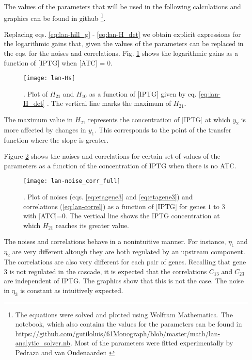 The values of the parameters that will be used in the following calculations and graphics can be found in github \footnote{The equations were solved and plotted using Wolfram Mathematica. The notebook, which also contains the values for the parameters can be found in \url{https://github.com/gutiloluis/61Monograph/blob/master/math/lan-analytic_solver.nb}. Most of the parameters were fitted experimentally by Pedraza and van Oudenaarden \cite{pedraza05}}. 

Replacing eqs. \eqref{eq:lan-hill_g} - \eqref{eq:lan-H_det} we obtain explicit expressions for the logarithmic gains that, given the values of the parameters can be replaced in the eqs. for the noises and correlations. Fig. \ref{fig:lan-Hs} shows the logarithmic gains as a function of [IPTG] when [ATC] = 0.

\begin{figure}[H]
  \centering
  \texttt{[image: lan-Hs]}
  \caption[Logarithmic gains for the genes of a cascade]{\label{fig:lan-Hs}. Plot of $H_{21}$ and $H_{10}$ as a function of [IPTG] given by eq. \eqref{eq:lan-H_det} . The vertical line marks the maximum of $H_{21}$.}
\end{figure}

The maximum value in $H_{21}$ represents the concentration of [IPTG] at which $y_2$ is more affected by changes in $y_1$. This corresponds to the point of the transfer function where the slope is greater.

Figure \ref{fig:lan-noise_corr_full} shows the noises and correlations for certain set of values of the parameters as a function of the concentration of IPTG when there is no ATC.

\begin{figure}[H]
  \centering
  \texttt{[image: lan-noise\_corr\_full]}
  \caption[Noises and correlation for the genes of a cascade]{\label{fig:lan-noise_corr_full}. Plot of noises (eqs. \eqref{eq:etagene3} and \eqref{eq:etagene3}) and correlations (\eqref{eq:lan-correl}) as a function of [IPTG] for genes $1$ to $3$ with [ATC]=0. The vertical line shows the IPTG concentration at which $H_{21}$ reaches its greater value.}
\end{figure}

The noises and correlations behave in a nonintuitive manner. For instance, $\eta_1$ and $\eta_2$ are very different altough they are both regulated by an upstream component. The correlations are also very different for each pair of genes. Recalling that gene $3$ is not regulated in the cascade, it is expected that the correlations $C_{13}$ and $C_{23}$ are independent of IPTG. The graphics show that this is not the case. The noise in $\eta_3$ is constant as intuitively expected.

